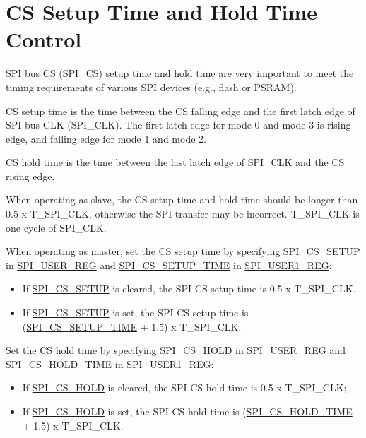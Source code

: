 \documentclass[main\_\_EN.tex]{subfiles}
\begin{document}
\section{CS Setup Time and Hold Time Control}\label{sec:gp-spi2-cs-timing}

SPI bus CS (SPI\_CS) setup time and hold time are very important to meet the timing requirements of various SPI devices (e.g., flash or PSRAM). 

CS setup time is the time between the CS falling edge and the first latch edge of SPI bus CLK (SPI\_CLK). The first latch edge for mode 0 and mode 3 is rising edge, and falling edge for mode 1 and mode 2. 

CS hold time is the time between the last latch edge of SPI\_CLK and the CS rising edge.

When operating as slave, the CS setup time and hold time should be longer than 0.5 x T\_SPI\_CLK, otherwise the SPI transfer may be incorrect. T\_SPI\_CLK is one cycle of SPI\_CLK.

When operating as master, set the CS setup time by specifying \hyperref[fielddesc:SPICSSETUP]{SPI\_CS\_SETUP} in \hyperref[regdesc:SPIUSERREG]{SPI\_USER\_REG} and  \hyperref[fielddesc:SPICSSETUPTIME]{SPI\_CS\_SETUP\_TIME} in \hyperref[regdesc:SPIUSER1REG]{SPI\_USER1\_REG}:
    \begin{itemize}
        \item If \hyperref[fielddesc:SPICSSETUP]{SPI\_CS\_SETUP} is cleared, the SPI CS setup time is 0.5 x T\_SPI\_CLK.
        \item If \hyperref[fielddesc:SPICSSETUP]{SPI\_CS\_SETUP} is set, the SPI CS setup time is (\hyperref[fielddesc:SPICSSETUPTIME]{SPI\_CS\_SETUP\_TIME} + 1.5) x T\_SPI\_CLK.
    \end{itemize}
        
Set the CS hold time by specifying \hyperref[fielddesc:SPICSHOLD]{SPI\_CS\_HOLD} in \hyperref[regdesc:SPIUSERREG]{SPI\_USER\_REG} and  \hyperref[fielddesc:SPICSHOLDTIME]{SPI\_CS\_HOLD\_TIME} in \hyperref[regdesc:SPIUSER1REG]{SPI\_USER1\_REG}:
    \begin{itemize}
        \item If \hyperref[fielddesc:SPICSHOLD]{SPI\_CS\_HOLD} is cleared, the SPI CS hold time is 0.5 x T\_SPI\_CLK;
        \item If \hyperref[fielddesc:SPICSHOLD]{SPI\_CS\_HOLD} is set, the SPI CS hold time is (\hyperref[fielddesc:SPICSHOLDTIME]{SPI\_CS\_HOLD\_TIME} + 1.5) x T\_SPI\_CLK.
    \end{itemize}
\end{document}
